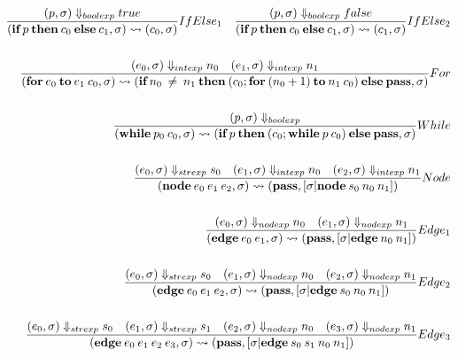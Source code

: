 \documentclass{article}
\begin{document}
\begin{align*}
    \frac{(p,\sigma)\Downarrow _{boolexp} true}
         {(\textbf{if}\: p\: \textbf{then}\: c_0\: \textbf{else}\: c_1,\sigma) \curly (c_0,\sigma)}IfElse_1 \quad
    \frac{(p,\sigma)\Downarrow _{boolexp} false}
         {(\textbf{if}\: p\: \textbf{then}\: c_0\: \textbf{else}\: c_1,\sigma) \curly (c_1,\sigma)}IfElse_2 \\~\\
    \frac{(e_0,\sigma) \Downarrow _{intexp} n_0 \quad (e_1,\sigma)\Downarrow _{intexp} n_1}
         {(\textbf{for}\: e_0 \: \textbf{to} \: e_1 \: c_0,\sigma) \curly (\textbf{if}\: n_0 \: \ne \: n_1 \: \textbf{then} \: (c_0;\textbf{for} \: (n_0 + 1) \: \textbf{to}\: n_1 \: c_0) \:\textbf{else}\: \textbf{pass},\sigma)}For \\~\\    
    \frac{(p,\sigma) \Downarrow _{boolexp}}
         {(\textbf{while}\: p_0 \: c_0,\sigma) \curly (\textbf{if}\: p \: \textbf{then} \: (c_0;\textbf{while} \: p \: c_0) \:\textbf{else}\: \textbf{pass},\sigma)}While    \\~\\      
    \frac{(e_0,\sigma) \Downarrow _{strexp} s_0 \quad (e_1, \sigma) \Downarrow _{intexp} n_0 \quad (e_2, \sigma) \Downarrow _{intexp} n_1}
         {(\textbf{node} \: e_0 \: e_1 \: e_2, \sigma) \curly (\textbf{pass}, [\sigma | \textbf{node} \: s_0 \: n_0 \: n_1])}Node   \\~\\
    \frac{(e_0, \sigma) \Downarrow _{nodexp} n_0 \quad (e_1, \sigma) \Downarrow _{nodexp} n_1}
         {(\textbf{edge} \: e_0 \: e_1, \sigma) \curly (\textbf{pass}, [\sigma | \textbf{edge} \: n_0 \: n_1])}Edge_1 \\~\\
    \frac{(e_0,\sigma) \Downarrow _{strexp} s_0 \quad (e_1, \sigma) \Downarrow _{nodexp} n_0 \quad (e_2, \sigma) \Downarrow _{nodexp} n_1}
         {(\textbf{edge} \: e_0 \: e_1 \: e_2, \sigma) \curly (\textbf{pass}, [\sigma | \textbf{edge} \: s_0 \: n_0 \: n_1])}Edge_2 \\~\\
    \frac{(e_0,\sigma) \Downarrow _{strexp} s_0 \quad (e_1,\sigma) \Downarrow _{strexp} s_1 \quad (e_2, \sigma) \Downarrow _{nodexp} n_0 \quad (e_3, \sigma) \Downarrow _{nodexp} n_1}
         {(\textbf{edge} \: e_0 \: e_1 \: e_2 \: e_3, \sigma) \curly (\textbf{pass}, [\sigma | \textbf{edge} \: s_0 \: s_1 \: n_0 \: n_1])}Edge_3 \\~\\

\end{align*}
\end{document}
